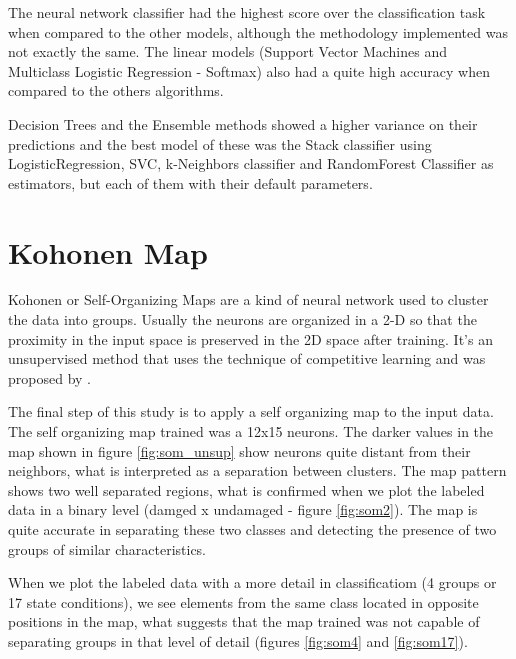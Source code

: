 \documentclass[twocolumn]{article}
\begin{document}
The neural network classifier had the highest score over the classification task when compared to the other models, although the methodology implemented was not exactly the same. The linear models (Support Vector Machines and Multiclass Logistic Regression - Softmax) also had a quite high accuracy when compared to the others algorithms.

Decision Trees and the Ensemble methods showed a higher variance on their predictions and the best model of these was the Stack classifier using LogisticRegression, SVC, k-Neighbors classifier and RandomForest Classifier as estimators, but each of them with their default parameters.


\section{Kohonen Map}

Kohonen or Self-Organizing Maps are a kind of neural network used to cluster the data into groups. Usually the neurons are organized in a 2-D so that the proximity in the input space is preserved in the 2D space after training. It's an unsupervised method that uses the technique of competitive learning and was proposed by \cite{kohonen}.

The final step of this study is to apply a self organizing map to the input data. The self organizing map trained was a 12x15 neurons. The darker values in the map shown in figure \ref*{fig:som_unsup} show neurons quite distant from their neighbors, what is interpreted as a separation between clusters. The map pattern shows two well separated regions, what is confirmed when we plot the labeled data in a binary level (damged x undamaged - figure \ref*{fig:som2}). The map is quite accurate in separating these two classes and detecting the presence of two groups of similar characteristics.

When we plot the labeled data with a more detail in classificatiom (4 groups or 17 state conditions), we see elements from the same class located in opposite positions in the map, what suggests that the map trained was not capable of separating groups in that level of detail (figures \ref*{fig:som4} and \ref*{fig:som17}).
\end{document}
